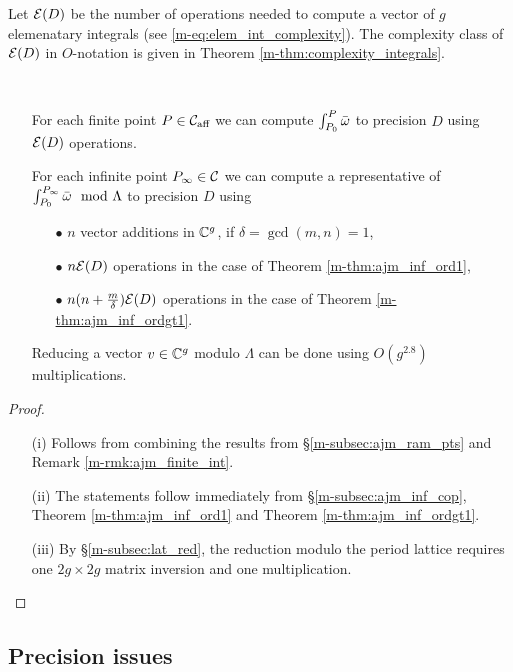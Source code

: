 \documentclass[main.tex]{subfiles}
\begin{document}
  Let $\mathcal E(D)$ be the number of operations needed to compute a vector of $g$ elemenatary integrals  (see \eqref{m-eq:elem_int_complexity}). The complexity class of $\mathcal E(D)$ in $O$-notation is given in
  Theorem \ref{m-thm:complexity_integrals}.

   \begin{thm} \
   \begin{itemize}
     \item[{\upshape{(i)}}] For each finite point $P \in \mathcal{C}_{\text{aff}}$ we can compute $\int_{P_0}^P \bar{\omega}$ to precision $D$ using
      $\mathcal E(D)$ operations.
     \item[{\upshape{(ii)}}] For each infinite point $P_{\infty} \in \mathcal{C}$ we can compute a representative of $\int_{P_0}^{P_{\infty}} \bar{\omega} \mod \Lambda$ to precision $D$ using
      \begin{itemize}
       \item[$\bullet$] $n$ vector additions in $\mathbb{C}^g$, if $\delta = \gcd(m,n) = 1$,
       \item[$\bullet$] $n \mathcal E(D)$ operations in the case of Theorem \ref{m-thm:ajm_inf_ord1},
       \item[$\bullet$] $n(n+\frac{m}\delta)\mathcal E(D)$ operations  in the case of Theorem \ref{m-thm:ajm_inf_ordgt1}.
      \end{itemize}
      \item[{\upshape{(iii)}}] Reducing a vector $v \in \mathbb{C}^g$ modulo $\Lambda$ can be done using $O(g^{2.8})$ multiplications.
    \end{itemize}
  \end{thm}
   \begin{proof}
    \begin{itemize}
     \item[(i)] Follows from combining the results from \S \ref{m-subsec:ajm_ram_pts} and Remark \ref{m-rmk:ajm_finite_int}.
     \item[(ii)] The statements follow immediately from \S \ref{m-subsec:ajm_inf_cop}, Theorem \ref{m-thm:ajm_inf_ord1} and Theorem \ref{m-thm:ajm_inf_ordgt1}.
     \item[(iii)] By \S \ref{m-subsec:lat_red}, the reduction modulo the period lattice requires one $2g \times 2g$ matrix inversion and one multiplication.
    \end{itemize}
   \end{proof}

   \subsection{Precision issues}
\end{document}
